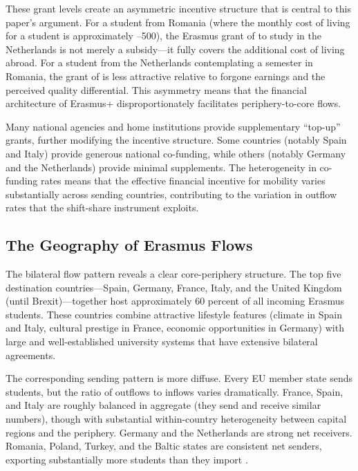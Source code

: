 \documentclass[12pt]{article}
\begin{document}
These grant levels create an asymmetric incentive structure that is central to this paper's argument. For a student from Romania (where the monthly cost of living for a student is approximately --500), the Erasmus grant of  to study in the Netherlands is not merely a subsidy---it fully covers the additional cost of living abroad. For a student from the Netherlands contemplating a semester in Romania, the grant of  is less attractive relative to forgone earnings and the perceived quality differential. This asymmetry means that the financial architecture of Erasmus+ disproportionately facilitates periphery-to-core flows.

Many national agencies and home institutions provide supplementary ``top-up'' grants, further modifying the incentive structure. Some countries (notably Spain and Italy) provide generous national co-funding, while others (notably Germany and the Netherlands) provide minimal supplements. The heterogeneity in co-funding rates means that the effective financial incentive for mobility varies substantially across sending countries, contributing to the variation in outflow rates that the shift-share instrument exploits.

\subsection{The Geography of Erasmus Flows}

The bilateral flow pattern reveals a clear core-periphery structure. The top five destination countries---Spain, Germany, France, Italy, and the United Kingdom (until Brexit)---together host approximately 60 percent of all incoming Erasmus students. These countries combine attractive lifestyle features (climate in Spain and Italy, cultural prestige in France, economic opportunities in Germany) with large and well-established university systems that have extensive bilateral agreements.

The corresponding sending pattern is more diffuse. Every EU member state sends students, but the ratio of outflows to inflows varies dramatically. France, Spain, and Italy are roughly balanced in aggregate (they send and receive similar numbers), though with substantial within-country heterogeneity between capital regions and the periphery. Germany and the Netherlands are strong net receivers. Romania, Poland, Turkey, and the Baltic states are consistent net senders, exporting substantially more students than they import \citep{eurostat2021}.
\end{document}
